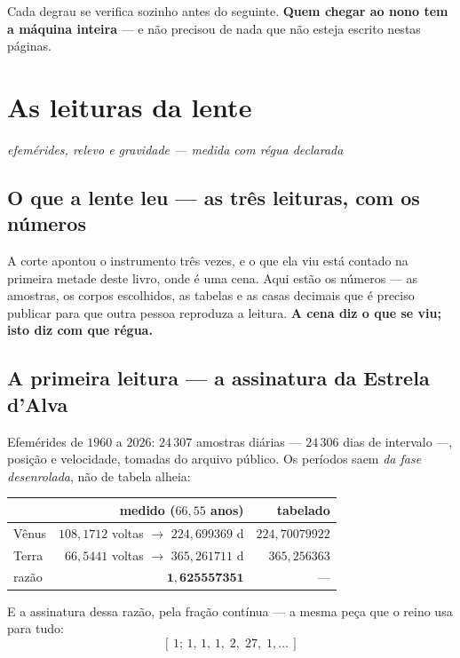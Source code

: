 \documentclass[11pt]{article}
\theoremstyle{plain}
\theoremstyle{remark}
\begin{document}
\noindent Cada degrau se verifica sozinho antes do seguinte. \textbf{Quem
chegar ao nono tem a máquina inteira} --- e não precisou de nada que não esteja
escrito nestas páginas.

\restoregeometry



\section{As leituras da lente}

\noindent\emph{efemérides, relevo e gravidade --- medida com régua declarada}

\subsection{O que a lente leu --- as três leituras, com os números}

\noindent A corte apontou o instrumento três vezes, e o que ela viu está contado na primeira
metade deste livro, onde é uma cena. Aqui estão os números --- as amostras, os corpos escolhidos,
as tabelas e as casas decimais que é preciso publicar para que outra pessoa reproduza a leitura.
\textbf{A cena diz o que se viu; isto diz com que régua.}

\subsection{A primeira leitura --- a assinatura da Estrela d'Alva}

Efemérides de $1960$ a $2026$: $24\,307$ amostras diárias --- $24\,306$ dias de
intervalo ---, posição e velocidade, tomadas do arquivo público. Os períodos saem \emph{da fase desenrolada}, não de tabela
alheia:

\begin{center}
\begin{tabular}{@{}lrr@{}}
\toprule
& medido ($66{,}55$ anos) & tabelado \\
\midrule
Vênus & $108{,}1712$ voltas $\to$ $224{,}699369$ d & $224{,}70079922$ \\
Terra & $\phantom{0}66{,}5441$ voltas $\to$ $365{,}261711$ d & $365{,}256363$ \\
razão & $\mathbf{1{,}625557351}$ & --- \\
\bottomrule
\end{tabular}
\end{center}

\noindent E a assinatura dessa razão, pela fração contínua --- a mesma peça que
o reino usa para tudo:
\[
[\,1;\,1,\,1,\,1,\;2,\;27,\;1,\dots\,]
\]
\end{document}
